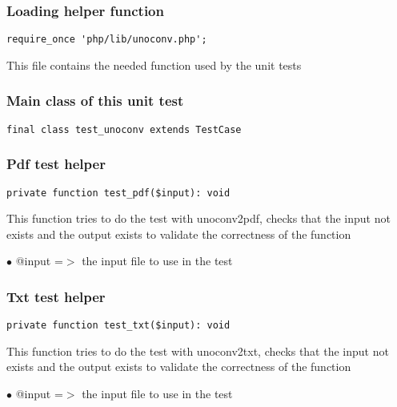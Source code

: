 \documentclass[a4paper]{article}
\begin{document}
\hypertarget{toc357}{}
\subsubsection{Loading helper function}

\begin{lstlisting}
require_once 'php/lib/unoconv.php';
\end{lstlisting}

This file contains the needed function used by the unit tests

\hypertarget{toc358}{}
\subsubsection{Main class of this unit test}

\begin{lstlisting}
final class test_unoconv extends TestCase
\end{lstlisting}

\hypertarget{toc359}{}
\subsubsection{Pdf test helper}

\begin{lstlisting}
private function test_pdf($input): void
\end{lstlisting}

This function tries to do the test with unoconv2pdf, checks
that the input not exists and the output exists to validate
the correctness of the function

\begin{compactitem}
\item[\color{myblue}$\bullet$] @input =$>$ the input file to use in the test
\end{compactitem}

\hypertarget{toc360}{}
\subsubsection{Txt test helper}

\begin{lstlisting}
private function test_txt($input): void
\end{lstlisting}

This function tries to do the test with unoconv2txt, checks
that the input not exists and the output exists to validate
the correctness of the function

\begin{compactitem}
\item[\color{myblue}$\bullet$] @input =$>$ the input file to use in the test
\end{compactitem}
\end{document}
